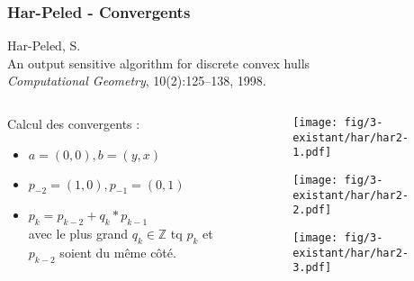 \begin{frame}
  \frametitle{Har-Peled - Convergents}

	\begin{block}{}
	\begin{tiny}
    [H98] Har-Peled, S.\\
    An output sensitive algorithm for discrete convex hulls\\
    {\em Computational Geometry}, 10(2):125--138, 1998.\\
    \end{tiny}
	\end{block} 


	\begin{columns}[t]
 		\begin{column}{5cm}
  		
			\begin{block}{}
	      Calcul des convergents :
	      \begin{itemize}
	        \item $a = (0,0), b = (y, x)$
	        \item $p_{-2} = (1,0), p_{-1} = (0,1)$
					\item<2-> \alert{$ p_{k} = p_{k-2} + q_{k}*p_{k-1}$}\\
		      avec le plus grand $q_{k} \in \mathbb{Z}$ tq $p_{k}$ et $p_{k-2}$ soient du même côté.
	      \end{itemize}
	    \end{block}
		\end{column}

		\begin{column}{5cm}
			\only<1>
			{
				\begin{figure}[h!]
					\centering
				  \texttt{[image: fig/3-existant/har/har2-1.pdf]}
			 	\end{figure}    
			}
			{
				\begin{figure}[h!]
					\centering
				  \texttt{[image: fig/3-existant/har/har2-2.pdf]}
			 	\end{figure}    
			}
			{
				\begin{figure}[h!]
					\centering
				  \texttt{[image: fig/3-existant/har/har2-3.pdf]}
			 	\end{figure}    
			}
	  \end{column}
	\end{columns}  

\end{frame}

